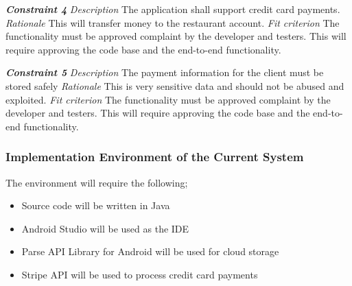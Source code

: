 \documentclass[12pt, titlepage]{article}
\begin{document}
\pagebreak
\noindent\textbf{\textit{Constraint 4}}
\newline
\textit{Description}\newline
The application shall support credit card payments. \newline\newline
\textit{Rationale}\newline
This will transfer money to the restaurant account. \newline\newline
\textit{Fit criterion}\newline
The functionality must be approved complaint by the developer and testers. This will require approving the code base and the end-to-end functionality.\newline\newline

\noindent\textbf{\textit{Constraint 5}}
\newline
\textit{Description}\newline
The payment information for the client must be stored safely \newline\newline
\textit{Rationale}\newline
This is very sensitive data and should not be abused and exploited. \newline\newline
\textit{Fit criterion}\newline
The functionality must be approved complaint by the developer and testers. This will require approving the code base and the end-to-end functionality.\newline\newline

\subsubsection{Implementation Environment of the Current System}
The environment will require the following;
\begin{itemize}
  \item Source code will be written in Java
  \item Android Studio will be used as the IDE
  \item 	Parse API Library for Android will be used for cloud storage
  \item 	Stripe API will be used to process credit card payments
\end{itemize}
\end{document}
